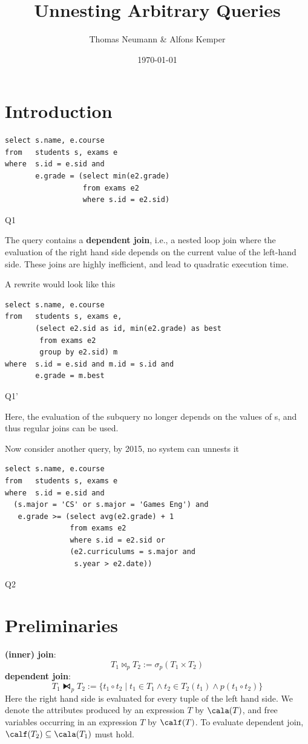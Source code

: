 \documentclass[11pt]{article}
\author{Thomas Neumann \& Alfons Kemper}
\date{\today}
\title{Unnesting Arbitrary Queries}
\begin{document}
\maketitle
\section{Introduction}
\label{sec:orgd95fb1a}
\begin{listing}[htbp]
\begin{verbatim}
select s.name, e.course
from   students s, exams e
where  s.id = e.sid and
       e.grade = (select min(e2.grade)
                  from exams e2
                  where s.id = e2.sid)
\end{verbatim}
\caption{Q1}
\end{listing}
The query contains a \textbf{dependent join}, i.e., a nested loop join where the evaluation of the right hand
side depends on the current value of the left-hand side. These joins are highly inefficient, and lead
to quadratic execution time.

A rewrite would look like this
\begin{listing}[htbp]
\begin{verbatim}
select s.name, e.course
from   students s, exams e,
       (select e2.sid as id, min(e2.grade) as best
        from exams e2
        group by e2.sid) m
where  s.id = e.sid and m.id = s.id and
       e.grade = m.best
\end{verbatim}
\caption{Q1'}
\end{listing}
Here, the evaluation of the subquery no longer depends on the values of s, and thus regular joins can
be used.

Now consider another query, by 2015, no system can unnests it
\begin{listing}[htbp]
\begin{verbatim}
select s.name, e.course
from   students s, exams e
where  s.id = e.sid and
  (s.major = 'CS' or s.major = 'Games Eng') and
   e.grade >= (select avg(e2.grade) + 1
               from exams e2
               where s.id = e2.sid or
               (e2.curriculums = s.major and
                s.year > e2.date))
\end{verbatim}
\caption{Q2}
\end{listing}
\section{Preliminaries}
\label{sec:org3e4d29c}
\textbf{(inner) join}:
\begin{equation*}
T_1\bowtie_p T_2:=\sigma_p(T_1\times T_2)
\end{equation*}
\textbf{dependent join}:
\begin{equation*}
T_1\lfbowtie_p T_2:=\{t_1\circ t_2\mid t_1\in T_1\wedge t_2\in T_2(t_1)\wedge p(t_1\circ t_2)\}
\end{equation*}
Here the right hand side is evaluated for every tuple of the left hand side. We denote the attributes
produced by an expression \(T\) by \(\cala(T)\), and free variables occurring in an expression \(T\)
by \(\calf(T)\). To evaluate dependent join, \(\calf(T_2)\subseteq \cala(T_1)\) must hold.
\end{document}
